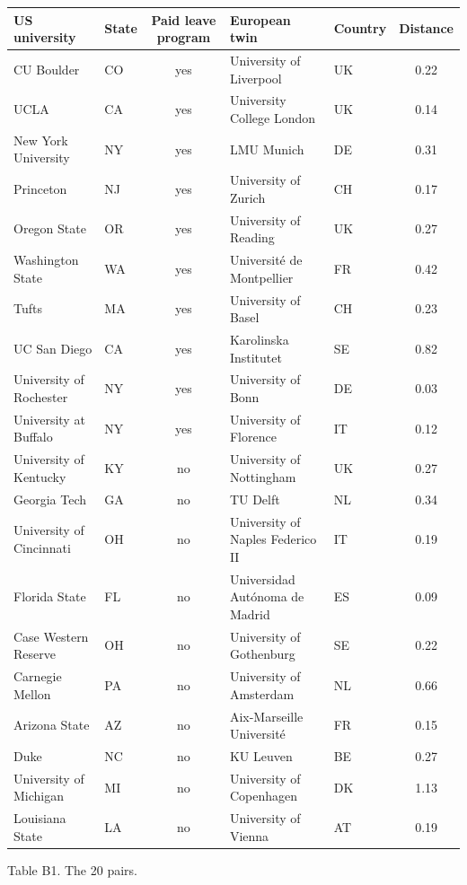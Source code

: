 \documentclass[10pt,twocolumn]{article}
\begin{document}
\begin{center}\small
\begin{tabular}{@{}llcllc@{}}
\toprule
US university & State & Paid leave program & European twin & Country & Distance \\ \midrule
CU Boulder & CO & yes & University of Liverpool & UK & 0.22 \\
UCLA & CA & yes & University College London & UK & 0.14 \\
New York University & NY & yes & LMU Munich & DE & 0.31 \\
Princeton & NJ & yes & University of Zurich & CH & 0.17 \\
Oregon State & OR & yes & University of Reading & UK & 0.27 \\
Washington State & WA & yes & Université de Montpellier & FR & 0.42 \\
Tufts & MA & yes & University of Basel & CH & 0.23 \\
UC San Diego & CA & yes & Karolinska Institutet & SE & 0.82 \\
University of Rochester & NY & yes & University of Bonn & DE & 0.03 \\
University at Buffalo & NY & yes & University of Florence & IT & 0.12 \\
University of Kentucky & KY & no & University of Nottingham & UK & 0.27 \\
Georgia Tech & GA & no & TU Delft & NL & 0.34 \\
University of Cincinnati & OH & no & University of Naples Federico II & IT & 0.19 \\
Florida State & FL & no & Universidad Autónoma de Madrid & ES & 0.09 \\
Case Western Reserve & OH & no & University of Gothenburg & SE & 0.22 \\
Carnegie Mellon & PA & no & University of Amsterdam & NL & 0.66 \\
Arizona State & AZ & no & Aix-Marseille Université & FR & 0.15 \\
Duke & NC & no & KU Leuven & BE & 0.27 \\
University of Michigan & MI & no & University of Copenhagen & DK & 1.13 \\
Louisiana State & LA & no & University of Vienna & AT & 0.19 \\ \bottomrule
\end{tabular}

\smallskip
Table B1. The 20 pairs.
\end{center}
\end{document}
